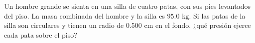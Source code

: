 \item Un hombre grande se sienta en una silla de cuatro patas, con sus pies levantados del piso. La masa combinada del hombre y la silla es $95.0 \text{ kg}$. Si las patas de la silla son circulares y tienen un radio de $0.500 \text{ cm}$ en el fondo, ¿qué presión ejerce cada pata sobre el piso?
